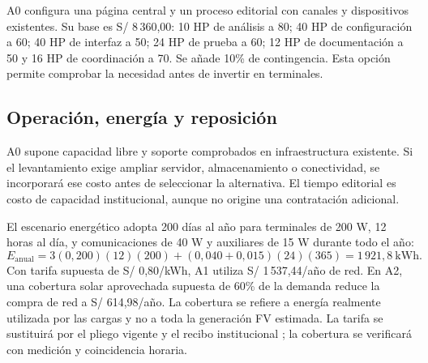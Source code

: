 A0 configura una página central y un proceso editorial con canales y dispositivos existentes. Su base es S/ 8\,360,00: 10 HP de análisis a 80; 40 HP de configuración a 60; 40 HP de interfaz a 50; 24 HP de prueba a 60; 12 HP de documentación a 50 y 16 HP de coordinación a 70. Se añade 10\% de contingencia. Esta opción permite comprobar la necesidad antes de invertir en terminales.


\subsection{Operación, energía y reposición}
A0 supone capacidad libre y soporte comprobados en infraestructura existente. Si el levantamiento exige ampliar servidor, almacenamiento o conectividad, se incorporará ese costo antes de seleccionar la alternativa. El tiempo editorial es costo de capacidad institucional, aunque no origine una contratación adicional.

El escenario energético adopta 200 días al año para terminales de 200 W, 12 horas al día, y comunicaciones de 40 W y auxiliares de 15 W durante todo el año:
\[
E_{\mathrm{anual}}=3(0,200)(12)(200)+(0,040+0,015)(24)(365)
=1\,921,8\ \mathrm{kWh}.
\]
Con tarifa supuesta de S/ 0,80/kWh, A1 utiliza S/ 1\,537,44/año de red. En A2, una cobertura solar aprovechada supuesta de 60\% de la demanda reduce la compra de red a S/ 614,98/año. La cobertura se refiere a energía realmente utilizada por las cargas y no a toda la generación FV estimada. La tarifa se sustituirá por el pliego vigente y el recibo institucional \cite{pliego}; la cobertura se verificará con medición y coincidencia horaria.

